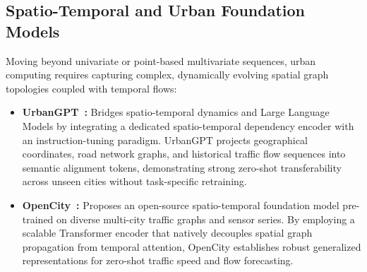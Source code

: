 \subsection{Spatio-Temporal and Urban Foundation Models}
Moving beyond univariate or point-based multivariate sequences, urban computing requires capturing complex, dynamically evolving spatial graph topologies coupled with temporal flows:
\begin{itemize}
    \item \textbf{UrbanGPT~\cite{Li2024UrbanGPT}:} Bridges spatio-temporal dynamics and Large Language Models by integrating a dedicated spatio-temporal dependency encoder with an instruction-tuning paradigm. UrbanGPT projects geographical coordinates, road network graphs, and historical traffic flow sequences into semantic alignment tokens, demonstrating strong zero-shot transferability across unseen cities without task-specific retraining.
    \item \textbf{OpenCity~\cite{Liu2024OpenCity}:} Proposes an open-source spatio-temporal foundation model pre-trained on diverse multi-city traffic graphs and sensor series. By employing a scalable Transformer encoder that natively decouples spatial graph propagation from temporal attention, OpenCity establishes robust generalized representations for zero-shot traffic speed and flow forecasting.
\end{itemize}


